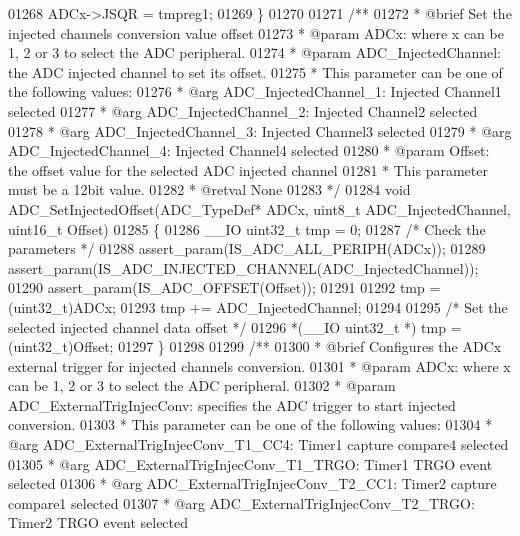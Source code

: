 \begin{DoxyCode}
01268   ADCx->JSQR = tmpreg1;
01269 \}
01270 
01271 \textcolor{comment}{/**}
01272 \textcolor{comment}{  * @brief  Set the injected channels conversion value offset}
01273 \textcolor{comment}{  * @param  ADCx: where x can be 1, 2 or 3 to select the ADC peripheral.}
01274 \textcolor{comment}{  * @param  ADC\_InjectedChannel: the ADC injected channel to set its offset. }
01275 \textcolor{comment}{  *          This parameter can be one of the following values:}
01276 \textcolor{comment}{  *            @arg ADC\_InjectedChannel\_1: Injected Channel1 selected}
01277 \textcolor{comment}{  *            @arg ADC\_InjectedChannel\_2: Injected Channel2 selected}
01278 \textcolor{comment}{  *            @arg ADC\_InjectedChannel\_3: Injected Channel3 selected}
01279 \textcolor{comment}{  *            @arg ADC\_InjectedChannel\_4: Injected Channel4 selected}
01280 \textcolor{comment}{  * @param  Offset: the offset value for the selected ADC injected channel}
01281 \textcolor{comment}{  *          This parameter must be a 12bit value.}
01282 \textcolor{comment}{  * @retval None}
01283 \textcolor{comment}{  */}
01284 \textcolor{keywordtype}{void} ADC_SetInjectedOffset(ADC\_TypeDef* ADCx, uint8\_t ADC\_InjectedChannel, uint16\_t Offset)
01285 \{
01286     \_\_IO uint32\_t tmp = 0;
01287   \textcolor{comment}{/* Check the parameters */}
01288   assert_param(IS\_ADC\_ALL\_PERIPH(ADCx));
01289   assert_param(IS\_ADC\_INJECTED\_CHANNEL(ADC\_InjectedChannel));
01290   assert_param(IS\_ADC\_OFFSET(Offset));
01291 
01292   tmp = (uint32\_t)ADCx;
01293   tmp += ADC\_InjectedChannel;
01294 
01295   \textcolor{comment}{/* Set the selected injected channel data offset */}
01296  *(\_\_IO uint32\_t *) tmp = (uint32\_t)Offset;
01297 \}
01298 
01299  \textcolor{comment}{/**}
01300 \textcolor{comment}{  * @brief  Configures the ADCx external trigger for injected channels conversion.}
01301 \textcolor{comment}{  * @param  ADCx: where x can be 1, 2 or 3 to select the ADC peripheral.}
01302 \textcolor{comment}{  * @param  ADC\_ExternalTrigInjecConv: specifies the ADC trigger to start injected conversion.}
01303 \textcolor{comment}{  *          This parameter can be one of the following values:                    }
01304 \textcolor{comment}{  *            @arg ADC\_ExternalTrigInjecConv\_T1\_CC4: Timer1 capture compare4 selected }
01305 \textcolor{comment}{  *            @arg ADC\_ExternalTrigInjecConv\_T1\_TRGO: Timer1 TRGO event selected }
01306 \textcolor{comment}{  *            @arg ADC\_ExternalTrigInjecConv\_T2\_CC1: Timer2 capture compare1 selected }
01307 \textcolor{comment}{  *            @arg ADC\_ExternalTrigInjecConv\_T2\_TRGO: Timer2 TRGO event selected }

\end{DoxyCode}
